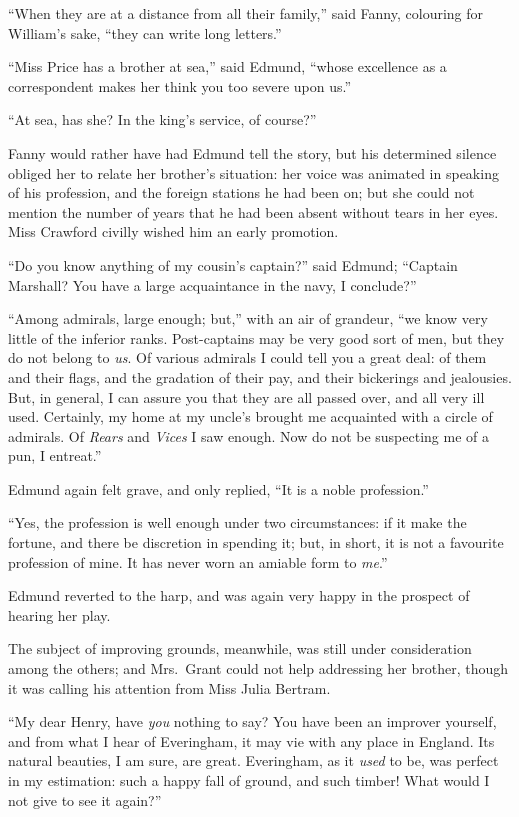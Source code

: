 ``When they are at a distance from all their family,''
said Fanny, colouring for William's sake, ``they can write
long letters.''

``Miss Price has a brother at sea,'' said Edmund,
``whose excellence as a correspondent makes her think
you too severe upon us.''

``At sea, has she?  In the king's service, of course?''

Fanny would rather have had Edmund tell the story,
but his determined silence obliged her to relate her
brother's situation:  her voice was animated in speaking
of his profession, and the foreign stations he had been on;
but she could not mention the number of years that he
had been absent without tears in her eyes.  Miss Crawford
civilly wished him an early promotion.

``Do you know anything of my cousin's captain?'' said Edmund;
``Captain Marshall?  You have a large acquaintance in the navy,
I conclude?''

``Among admirals, large enough; but,'' with an air of grandeur,
``we know very little of the inferior ranks.  Post-captains may
be very good sort of men, but they do not belong to \emph{us}.
Of various admirals I could tell you a great deal:
of them and their flags, and the gradation of their pay,
and their bickerings and jealousies.  But, in general,
I can assure you that they are all passed over, and all
very ill used.  Certainly, my home at my uncle's brought
me acquainted with a circle of admirals.  Of \emph{Rears} and
\emph{Vices} I saw enough.  Now do not be suspecting me of a pun,
I entreat.''

Edmund again felt grave, and only replied, ``It is
a noble profession.''

``Yes, the profession is well enough under two circumstances:
if it make the fortune, and there be discretion in spending it;
but, in short, it is not a favourite profession of mine.
It has never worn an amiable form to \emph{me}.''

Edmund reverted to the harp, and was again very happy
in the prospect of hearing her play.

The subject of improving grounds, meanwhile, was still
under consideration among the others; and Mrs.\ Grant could
not help addressing her brother, though it was calling
his attention from Miss Julia Bertram.

``My dear Henry, have \emph{you} nothing to say?  You have been
an improver yourself, and from what I hear of Everingham,
it may vie with any place in England.  Its natural beauties,
I am sure, are great.  Everingham, as it \emph{used} to be,
was perfect in my estimation:  such a happy fall of ground,
and such timber!  What would I not give to see it again?''

